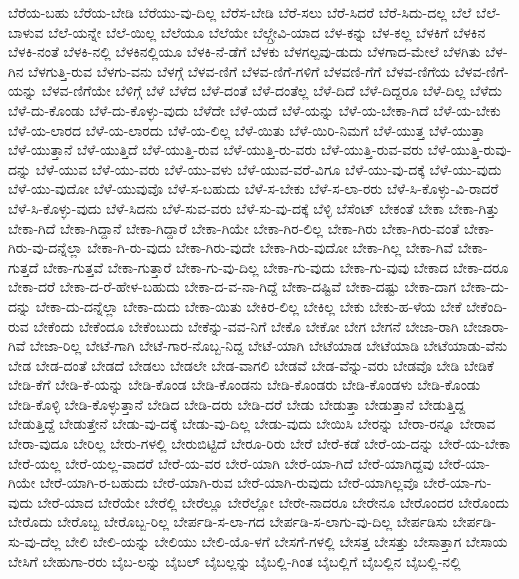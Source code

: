 {ಬೆರೆಯ-ಬಹು
ಬೆರೆಯ-ಬೇಡಿ
ಬೆರೆಯು-ವು-ದಿಲ್ಲ
ಬೆರೆಸ-ಬೇಡಿ
ಬೆರೆ-ಸಲು
ಬೆರೆ-ಸಿದರೆ
ಬೆರೆ-ಸಿದು-ದಲ್ಲ
ಬೆಲೆ
ಬೆಲೆ-ಬಾಳುವ
ಬೆಲೆ-ಯನ್ನೇ
ಬೆಲೆ-ಯಿಲ್ಲ
ಬೆಲೆಯೂ
ಬೆಲೆಯೇ
ಬೆಲ್ಗ್ರೇವಿ-ಯಾದ
ಬೆಳ-ಕನ್ನು
ಬೆಳ-ಕಲ್ಲ
ಬೆಳಕಿಗೆ
ಬೆಳಕಿನ
ಬೆಳಕಿ-ನಂತೆ
ಬೆಳಕಿ-ನಲ್ಲಿ
ಬೆಳಕಿನಲ್ಲಿಯೂ
ಬೆಳಕಿ-ನೆ-ಡೆಗೆ
ಬೆಳಕು
ಬೆಳಗಲ್ಪವು-ಡುದು
ಬೆಳಗಾದ-ಮೇಲೆ
ಬೆಳಗಿತು
ಬೆಳ-ಗಿನ
ಬೆಳಗುತ್ತಿ-ರುವ
ಬೆಳಗು-ವನು
ಬೆಳಗ್ಗೆ
ಬೆಳವ-ಣಿಗೆ
ಬೆಳವ-ಣಿಗೆ-ಗಳಿಗೆ
ಬೆಳವಣಿ-ಗೆಗೆ
ಬೆಳವ-ಣಿಗೆಯ
ಬೆಳವ-ಣಿಗೆ-ಯನ್ನು
ಬೆಳವ-ಣಿಗೆಯೇ
ಬೆಳಿಗ್ಗೆ
ಬೆಳೆ
ಬೆಳೆದ
ಬೆಳೆ-ದಂತೆ
ಬೆಳೆ-ದಂತೆಲ್ಲ
ಬೆಳೆ-ದಿದೆ
ಬೆಳೆ-ದಿದ್ದರೂ
ಬೆಳೆ-ದಿಲ್ಲ
ಬೆಳೆದು
ಬೆಳೆ-ದು-ಕೊಂಡು
ಬೆಳೆ-ದು-ಕೊಳ್ಳು-ವುದು
ಬೆಳೆದೇ
ಬೆಳೆ-ಯದೆ
ಬೆಳೆ-ಯನ್ನು
ಬೆಳೆ-ಯ-ಬೇಕಾ-ಗಿದೆ
ಬೆಳೆ-ಯ-ಬೇಕು
ಬೆಳೆ-ಯ-ಲಾರದ
ಬೆಳೆ-ಯ-ಲಾರದು
ಬೆಳೆ-ಯ-ಲಿಲ್ಲ
ಬೆಳೆ-ಯಿತು
ಬೆಳೆ-ಯಿರಿ-ನಿಮಗೆ
ಬೆಳೆ-ಯುತ್ತ
ಬೆಳೆ-ಯುತ್ತಾ
ಬೆಳೆ-ಯುತ್ತಾನೆ
ಬೆಳೆ-ಯುತ್ತಿದೆ
ಬೆಳೆ-ಯುತ್ತಿ-ರುವ
ಬೆಳೆ-ಯುತ್ತಿ-ರು-ವರು
ಬೆಳೆ-ಯುತ್ತಿ-ರುವ-ವರು
ಬೆಳೆ-ಯುತ್ತಿ-ರುವು-ದನ್ನು
ಬೆಳೆ-ಯುವ
ಬೆಳೆ-ಯು-ವರು
ಬೆಳೆ-ಯು-ವಳು
ಬೆಳೆ-ಯುವ-ವರೆ-ವಿಗೂ
ಬೆಳೆ-ಯು-ವು-ದಕ್ಕೆ
ಬೆಳೆ-ಯು-ವುದು
ಬೆಳೆ-ಯು-ವುದೋ
ಬೆಳೆ-ಯುವುವೊ
ಬೆಳೆ-ಸ-ಬಹುದು
ಬೆಳೆ-ಸ-ಬೇಕು
ಬೆಳೆ-ಸ-ಲಾ-ರರು
ಬೆಳೆ-ಸಿ-ಕೊಳ್ಳು-ವಿ-ರಾದರೆ
ಬೆಳೆ-ಸಿ-ಕೊಳ್ಳು-ವುದು
ಬೆಳೆ-ಸಿದನು
ಬೆಳೆ-ಸುವ-ವರು
ಬೆಳೆ-ಸು-ವು-ದಕ್ಕೆ
ಬೆಳ್ಳಿ
ಬೆಸೆಂಟ್
ಬೇಕಂತೆ
ಬೇಕಾ
ಬೇಕಾ-ಗಿತ್ತು
ಬೇಕಾ-ಗಿದೆ
ಬೇಕಾ-ಗಿದ್ದಾನೆ
ಬೇಕಾ-ಗಿದ್ದಾರೆ
ಬೇಕಾ-ಗಿಯೇ
ಬೇಕಾ-ಗಿರ-ಲಿಲ್ಲ
ಬೇಕಾ-ಗಿರು
ಬೇಕಾ-ಗಿರು-ವಂತೆ
ಬೇಕಾ-ಗಿರು-ವು-ದನ್ನೆಲ್ಲಾ
ಬೇಕಾ-ಗಿ-ರು-ವುದು
ಬೇಕಾ-ಗಿರು-ವುದೇ
ಬೇಕಾ-ಗಿರು-ವುದೋ
ಬೇಕಾ-ಗಿಲ್ಲ
ಬೇಕಾ-ಗಿವೆ
ಬೇಕಾ-ಗುತ್ತದೆ
ಬೇಕಾ-ಗುತ್ತವೆ
ಬೇಕಾ-ಗುತ್ತಾರೆ
ಬೇಕಾ-ಗು-ವು-ದಿಲ್ಲ
ಬೇಕಾ-ಗು-ವುದು
ಬೇಕಾ-ಗು-ವುವು
ಬೇಕಾದ
ಬೇಕಾ-ದರೂ
ಬೇಕಾ-ದರೆ
ಬೇಕಾ-ದ-ರೆ-ಹೇಳ-ಬಹುದು
ಬೇಕಾ-ದ-ವ-ನಾ-ಗಿದ್ದೆ
ಬೇಕಾ-ದಷ್ಟಿವೆ
ಬೇಕಾ-ದಷ್ಟು
ಬೇಕಾ-ದಾಗ
ಬೇಕಾ-ದು-ದನ್ನು
ಬೇಕಾ-ದು-ದನ್ನೆಲ್ಲಾ
ಬೇಕಾ-ದುದು
ಬೇಕಾ-ಯಿತು
ಬೇಕಿರ-ಲಿಲ್ಲ
ಬೇಕಿಲ್ಲ
ಬೇಕು
ಬೇಕು-ಹ-ಳೆಯ
ಬೇಕೆ
ಬೇಕೆಂದಿ-ರುವ
ಬೇಕೆಂದು
ಬೇಕೆಂದೂ
ಬೇಕೆಂಬುದು
ಬೇಕೆನ್ನು-ವವ-ನಿಗೆ
ಬೇಕೊ
ಬೇಕೋ
ಬೇಗ
ಬೇಗನೆ
ಬೇಜಾ-ರಾಗಿ
ಬೇಜಾರಾ-ಗಿವೆ
ಬೇಜಾ-ರಿಲ್ಲ
ಬೇಟೆ-ಗಾಗಿ
ಬೇಟೆ-ಗಾರ-ನೊಬ್ಬ-ನಿದ್ದ
ಬೇಟೆ-ಯಾಗಿ
ಬೇಟೆಯಾಡ
ಬೇಟೆಯಾಡಿ
ಬೇಟೆಯಾಡು-ವೆನು
ಬೇಡ
ಬೇಡ-ದಂತೆ
ಬೇಡದೆ
ಬೇಡಲು
ಬೇಡಲೇ
ಬೇಡ-ವಾಗಲಿ
ಬೇಡವೆ
ಬೇಡ-ವೆನ್ನು-ವರು
ಬೇಡವೊ
ಬೇಡಿ
ಬೇಡಿಕೆ
ಬೇಡಿ-ಕೆಗೆ
ಬೇಡಿ-ಕೆ-ಯನ್ನು
ಬೇಡಿ-ಕೊಂಡ
ಬೇಡಿ-ಕೊಂಡನು
ಬೇಡಿ-ಕೊಂಡರು
ಬೇಡಿ-ಕೊಂಡಳು
ಬೇಡಿ-ಕೊಂಡು
ಬೇಡಿ-ಕೊಳ್ಳಿ
ಬೇಡಿ-ಕೊಳ್ಳುತ್ತಾನೆ
ಬೇಡಿದ
ಬೇಡಿ-ದರು
ಬೇಡಿ-ದರೆ
ಬೇಡು
ಬೇಡುತ್ತಾ
ಬೇಡುತ್ತಾನೆ
ಬೇಡುತ್ತಿದ್ದ
ಬೇಡುತ್ತಿದ್ದೆ
ಬೇಡುತ್ತೇನೆ
ಬೇಡು-ವು-ದಕ್ಕೆ
ಬೇಡು-ವು-ದಿಲ್ಲ
ಬೇಡು-ವುದು
ಬೇಯಿಸಿ
ಬೇರನ್ನು
ಬೇರಾ-ರನ್ನೂ
ಬೇರಾವ
ಬೇರಾ-ವುದೂ
ಬೇರಿಲ್ಲ
ಬೇರು-ಗಳಲ್ಲಿ
ಬೇರುಬಿಟ್ಟಿದೆ
ಬೇರೂ-ರಿರು
ಬೇರೆ
ಬೇರೆ-ಕಡೆ
ಬೇರೆ-ಯ-ದನ್ನು
ಬೇರೆ-ಯ-ಬೇಕಾ
ಬೇರೆ-ಯಲ್ಲ
ಬೇರೆ-ಯಲ್ಲ-ವಾದರೆ
ಬೇರೆ-ಯ-ವರ
ಬೇರೆ-ಯಾಗಿ
ಬೇರೆ-ಯಾ-ಗಿದೆ
ಬೇರೆ-ಯಾಗಿದ್ದವು
ಬೇರೆ-ಯಾ-ಗಿಯೇ
ಬೇರೆ-ಯಾಗಿ-ರ-ಬಹುದು
ಬೇರೆ-ಯಾಗಿ-ರುವ
ಬೇರೆ-ಯಾಗಿ-ರುವುದು
ಬೇರೆ-ಯಾಗಿಲ್ಲವೊ
ಬೇರೆ-ಯಾ-ಗು-ವುದು
ಬೇರೆ-ಯಾದ
ಬೇರೆಯೇ
ಬೇರೆಲ್ಲಿ
ಬೇರೆಲ್ಲೂ
ಬೇರೆಲ್ಲೋ
ಬೇರೇ-ನಾದರೂ
ಬೇರೇನೂ
ಬೇರೊಂದರ
ಬೇರೊಂದು
ಬೇರೊದು
ಬೇರೊಬ್ಬ
ಬೇರೊಬ್ಬ-ರಿಲ್ಲ
ಬೇರ್ಪಡಿ-ಸ-ಲಾ-ಗದ
ಬೇರ್ಪಡಿ-ಸ-ಲಾಗು-ವು-ದಿಲ್ಲ
ಬೇರ್ಪಡಿಸು
ಬೇರ್ಪಡಿ-ಸು-ವು-ದೆಲ್ಲ
ಬೇಲಿ
ಬೇಲಿ-ಯನ್ನು
ಬೇಲಿಯು
ಬೇಲಿ-ಯೊ-ಳಗೆ
ಬೇಸಗೆ-ಗಳಲ್ಲಿ
ಬೇಸತ್ತ
ಬೇಸತ್ತು
ಬೇಸಾತ್ತಾಗ
ಬೇಸಾಯ
ಬೇಸಿಗೆ
ಬೇಹುಗಾ-ರರು
ಬೈಬ-ಲನ್ನು
ಬೈಬಲ್
ಬೈಬಲ್ಲನ್ನು
ಬೈಬಲ್ಲಿ-ಗಿಂತ
ಬೈಬಲ್ಲಿಗೆ
ಬೈಬಲ್ಲಿನ
ಬೈಬಲ್ಲಿ-ನಲ್ಲಿ
}
